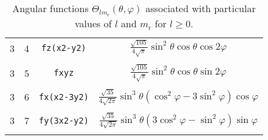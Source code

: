 \begin{table}
\begin{center}
\begin{tabular}{|cccc|}
 3  &  4  &  \verb#fz(x2-y2)# & 
$\frac{\sqrt{105}}{4\sqrt{\pi}}\sin^{2}\theta\cos\theta\cos2\varphi$\\
&&&\\
 3  &  5  &  \verb#fxyz# & 
$\frac{\sqrt{105}}{4\sqrt{\pi}}\sin^{2}\theta\cos\theta\sin2\varphi$\\
&&&\\
 3  &  6  &  \verb#fx(x2-3y2)# & 
$\frac{\sqrt{35}}{4\sqrt{2\pi}}\sin^{3}\theta(\cos^{2}\varphi-3\sin^{2}\varphi)\cos\varphi$\\
&&&\\
 3  &  7  &  \verb#fy(3x2-y2)# & 
$\frac{\sqrt{35}}{4\sqrt{2\pi}}\sin^{3}\theta(3\cos^{2}\varphi-\sin^{2}\varphi)\sin\varphi$\\
&&&\\\hline\hline
\end{tabular}
\caption{Angular functions
$\Theta_{lm_{\mathrm{r}}}(\theta,\varphi)$
associated with particular values of $l$ and $m_{\mathrm{r}}$ for
$l\ge0$.
\label{tab:angular}}
\end{center}
\end{table}



